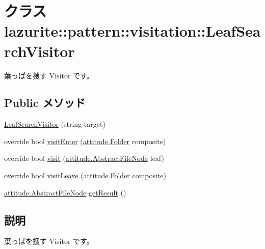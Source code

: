 \hypertarget{classlazurite_1_1pattern_1_1visitation_1_1_leaf_search_visitor}{
\section{クラス lazurite::pattern::visitation::LeafSearchVisitor}
\label{classlazurite_1_1pattern_1_1visitation_1_1_leaf_search_visitor}
}


葉っぱを捜す Visitor です。  
\subsection*{Public メソッド}
\begin{DoxyCompactItemize}
\item 
\hyperlink{classlazurite_1_1pattern_1_1visitation_1_1_leaf_search_visitor_a43c3e289d0678c77f4d0fc86caeb72d1}{LeafSearchVisitor} (string target)
\item 
override bool \hyperlink{classlazurite_1_1pattern_1_1visitation_1_1_leaf_search_visitor_a8dfcf50abeb69e84650fc98acc0e76d5}{visitEnter} (\hyperlink{classlazurite_1_1attitude_1_1_folder}{attitude.Folder} composite)
\item 
override bool \hyperlink{classlazurite_1_1pattern_1_1visitation_1_1_leaf_search_visitor_aa6ddfe4f263ca1bc56baf0e257dbcc52}{visit} (\hyperlink{classlazurite_1_1attitude_1_1_abstract_file_node}{attitude.AbstractFileNode} leaf)
\item 
override bool \hyperlink{classlazurite_1_1pattern_1_1visitation_1_1_leaf_search_visitor_a95d360067f5676e54d89833c10e0456e}{visitLeave} (\hyperlink{classlazurite_1_1attitude_1_1_folder}{attitude.Folder} composite)
\item 
\hyperlink{classlazurite_1_1attitude_1_1_abstract_file_node}{attitude.AbstractFileNode} \hyperlink{classlazurite_1_1pattern_1_1visitation_1_1_leaf_search_visitor_a96e6823eb116d8d8f8670b47dbd9ac7e}{getResult} ()
\end{DoxyCompactItemize}


\subsection{説明}
葉っぱを捜す Visitor です。 

